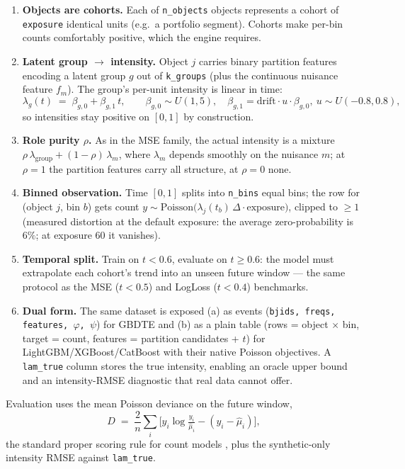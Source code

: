 \documentclass[11pt]{article}
\newcommand{\code}[1]{\texttt{\small #1}}
\begin{document}
\begin{enumerate}
\item \textbf{Objects are cohorts.} Each of \code{n\_objects} objects represents a
      cohort of \code{exposure} identical units (e.g.\ a portfolio segment). Cohorts
      make per-bin counts comfortably positive, which the engine requires.
\item \textbf{Latent group $\to$ intensity.} Object $j$ carries binary partition
      features encoding a latent group $g$ out of \code{k\_groups} (plus the continuous
      nuisance feature $f_m$). The group's per-unit intensity is linear in time:
      \[
      \lambda_g(t) \;=\; \beta_{g,0} + \beta_{g,1}\, t,
      \qquad \beta_{g,0} \sim U(1,5),\quad
      \beta_{g,1} = \text{drift} \cdot u \cdot \beta_{g,0},\ u \sim U(-0.8, 0.8),
      \]
      so intensities stay positive on $[0,1]$ by construction.
\item \textbf{Role purity $\rho$.} As in the MSE family, the actual intensity is a
      mixture $\rho\,\lambda_{\text{group}} + (1-\rho)\,\lambda_m$, where $\lambda_m$
      depends smoothly on the nuisance $m$; at $\rho = 1$ the partition features carry
      all structure, at $\rho = 0$ none.
\item \textbf{Binned observation.} Time $[0,1]$ splits into \code{n\_bins} equal bins;
      the row for (object $j$, bin $b$) gets count
      $y \sim \mathrm{Poisson}\!\big(\lambda_j(t_b)\, \Delta \cdot \text{exposure}\big)$,
      clipped to $\ge 1$ (measured distortion at the default exposure: the average
      zero-probability is $6\%$; at exposure 60 it vanishes).
\item \textbf{Temporal split.} Train on $t < 0.6$, evaluate on $t \ge 0.6$: the model
      must extrapolate each cohort's trend into an unseen future window --- the same
      protocol as the MSE ($t<0.5$) and LogLoss ($t<0.4$) benchmarks.
\item \textbf{Dual form.} The same dataset is exposed (a) as events
      (\code{bjids, freqs, features, $\varphi$, $\psi$}) for GBDTE and (b) as a plain
      table (rows = object $\times$ bin, target = count, features = partition
      candidates + $t$) for LightGBM/XGBoost/CatBoost with their native Poisson
      objectives. A \code{lam\_true} column stores the true intensity, enabling an
      oracle upper bound and an intensity-RMSE diagnostic that real data cannot offer.
\end{enumerate}

Evaluation uses the mean Poisson deviance on the future window,
\[
D \;=\; \frac{2}{n}\sum_i \Big[ y_i \log \tfrac{y_i}{\hat\mu_i} - (y_i - \hat\mu_i) \Big],
\]
the standard proper scoring rule for count models \cite{cameron2013,wuthrich2023}, plus
the synthetic-only intensity RMSE against \code{lam\_true}.
\end{document}
